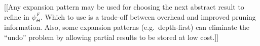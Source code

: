 \documentclass{article}
\newtheorem{theorem}{Theorem}
\newtheorem{definition} {Definition}
\newcommand{\OpSym}{\mathrm{O\!p}}
\newcommand{\opsym}{{\scriptstyle \mathrm{o\!p}}}
\newcommand{\OpCurry}[3][]{\mathop{\OpSym^{#1}_{#2}{#3}}}
\newcommand{\opcurry}[3][]{\mathop{\opsym^{#1}_{#2}{#3}}}
\newcommand{\Op}[2][]{\OpCurry[#1]{#2}{}}
\newcommand{\op}[2][]{\opcurry[#1]{#2}{}}
\newcommand{\GNP}{\psi_{\Theta}}
\begin{document}
[[Any expansion pattern may be used for choosing the next abstract
result to refine in $\GNP^F$.  Which to use is a trade-off between
overhead and improved pruning information.  Also, some expansion
patterns (e.g.~depth-first) can eliminate the ``undo'' problem by
allowing partial results to be stored at low cost.]]

\appendix

% 
% 
% 
\end{document}
